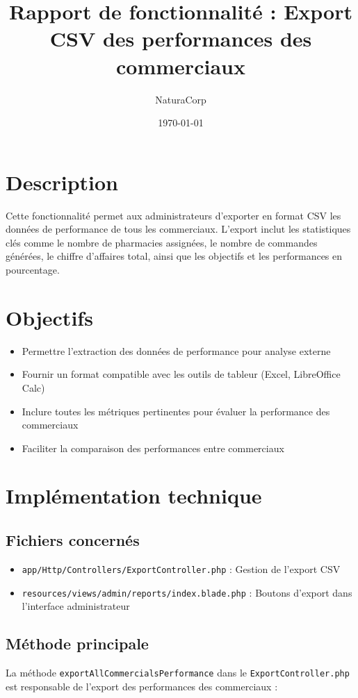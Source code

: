 \documentclass[12pt,a4paper]{article}
\title{Rapport de fonctionnalité : Export CSV des performances des commerciaux}
\author{NaturaCorp}
\date{\today}
\begin{document}
\maketitle

\section{Description}
Cette fonctionnalité permet aux administrateurs d'exporter en format CSV les données de performance de tous les commerciaux. L'export inclut les statistiques clés comme le nombre de pharmacies assignées, le nombre de commandes générées, le chiffre d'affaires total, ainsi que les objectifs et les performances en pourcentage.

\section{Objectifs}
\begin{itemize}
    \item Permettre l'extraction des données de performance pour analyse externe
    \item Fournir un format compatible avec les outils de tableur (Excel, LibreOffice Calc)
    \item Inclure toutes les métriques pertinentes pour évaluer la performance des commerciaux
    \item Faciliter la comparaison des performances entre commerciaux
\end{itemize}

\section{Implémentation technique}

\subsection{Fichiers concernés}
\begin{itemize}
    \item \texttt{app/Http/Controllers/ExportController.php} : Gestion de l'export CSV
    \item \texttt{resources/views/admin/reports/index.blade.php} : Boutons d'export dans l'interface administrateur
\end{itemize}

\subsection{Méthode principale}
La méthode \texttt{exportAllCommercialsPerformance} dans le \texttt{ExportController.php} est responsable de l'export des performances des commerciaux :
\end{document}
